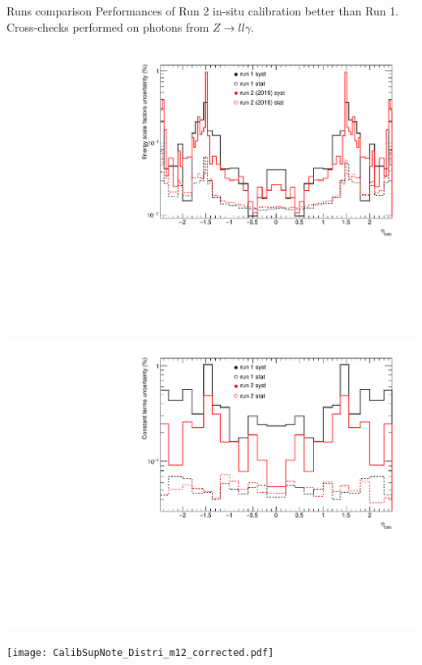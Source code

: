 \begin{frame}{Runs comparison}
  Performances of Run 2 in-situ calibration better than Run 1.
  Cross-checks performed on photons from $Z\rightarrow ll\gamma$.\\
  \begin{minipage}{0.45\linewidth} 
    \includegraphics[width=\linewidth]{Figures/CompareSystRun_alpha.pdf}\\
        \includegraphics[width=\linewidth]{Figures/CompareSystRun_c.pdf}
  \end{minipage}
  \hfill
  \begin{minipage}{0.54\linewidth}
    \texttt{[image: CalibSupNote\_Distri\_m12\_corrected.pdf]}
  \end{minipage}

\end{frame}

